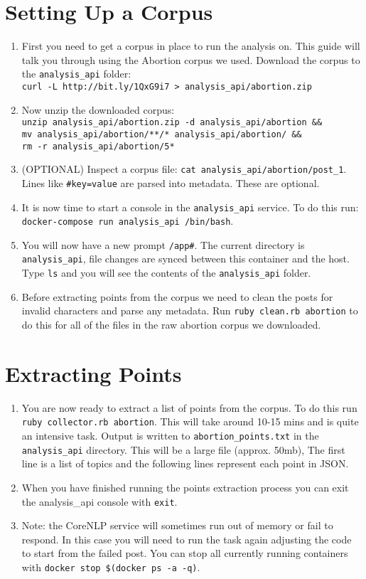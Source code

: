 \section{Setting Up a Corpus}
\begin{enumerate}
	\item{First you need to get a corpus in place to run the analysis on. This guide will talk you through using the Abortion corpus we used. Download the corpus to the \texttt{analysis\_api} folder: \\  \texttt{curl -L http://bit.ly/1QxG9i7 > analysis\_api/abortion.zip}}
	\item{Now unzip the downloaded corpus: \\ \texttt{unzip analysis\_api/abortion.zip -d analysis\_api/abortion \&\& \\ mv analysis\_api/abortion/**/* analysis\_api/abortion/ \&\& \\ rm -r analysis\_api/abortion/5*}}
	\item{(OPTIONAL) Inspect a corpus file: \texttt{cat analysis\_api/abortion/post\_1}. Lines like \texttt{\#key=value} are parsed into metadata. These are optional.}
	\item{It is now time to start a console in the \texttt{analysis\_api} service. To do this run: \texttt{docker-compose run analysis\_api /bin/bash}.}
	\item{You will now have a new prompt \texttt{/app\#}. The current directory is \texttt{analysis\_api}, file changes are synced between this container and the host. Type \texttt{ls} and you will see the contents of the \texttt{analysis\_api} folder.}
	\item{Before extracting points from the corpus we need to clean the posts for invalid characters and parse any metadata. Run \texttt{ruby clean.rb abortion} to do this for all of the files in the raw abortion corpus we downloaded.}
\end{enumerate}

\section{Extracting Points}
\begin{enumerate}
	\item{You are now ready to extract a list of points from the corpus. To do this run \texttt{ruby collector.rb abortion}. This will take around 10-15 mins and is quite an intensive task. Output is written to \texttt{abortion\_points.txt} in the \texttt{analysis\_api} directory. This will be a large file (approx. 50mb), The first line is a list of topics and the following lines represent each point in JSON.}
	\item{When you have finished running the points extraction process you  can exit the analysis\_api console with \texttt{exit}.}
    \item{Note: the CoreNLP service will sometimes run out of memory or fail to respond. In this case you will need to run the task again adjusting the code to start from the failed post. You can stop all currently running containers with \texttt{docker stop \$(docker ps -a -q)}}.
\end{enumerate}

